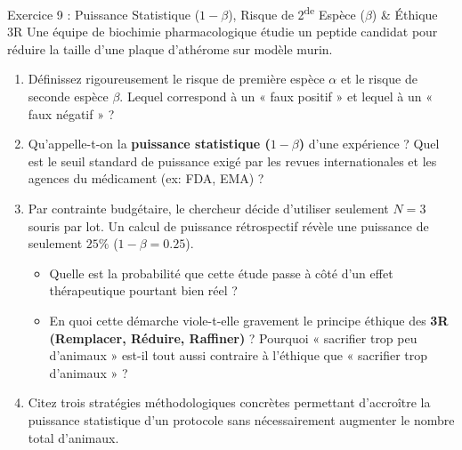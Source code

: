 \documentclass[11pt,a4paper]{article}
\begin{document}
\begin{exercicebox}{Exercice 9 : Puissance Statistique ($1-\beta$), Risque de 2\textsuperscript{de} Espèce ($\beta$) \& Éthique 3R}
Une équipe de biochimie pharmacologique étudie un peptide candidat pour réduire la taille d'une plaque d'athérome sur modèle murin.
\begin{enumerate}[label=\textbf{\alph*.}]
  \item Définissez rigoureusement le risque de première espèce $\alpha$ et le risque de seconde espèce $\beta$. Lequel correspond à un « faux positif » et lequel à un « faux négatif » ?
  \item Qu'appelle-t-on la \textbf{puissance statistique ($1 - \beta$)} d'une expérience ? Quel est le seuil standard de puissance exigé par les revues internationales et les agences du médicament (ex: FDA, EMA) ?
  \item Par contrainte budgétaire, le chercheur décide d'utiliser seulement $N = 3$ souris par lot. Un calcul de puissance rétrospectif révèle une puissance de seulement $25\%$ ($1 - \beta = 0.25$).
  \begin{itemize}
    \item Quelle est la probabilité que cette étude passe à côté d'un effet thérapeutique pourtant bien réel ?
    \item En quoi cette démarche viole-t-elle gravement le principe éthique des \textbf{3R (Remplacer, Réduire, Raffiner)} ? Pourquoi « sacrifier trop peu d'animaux » est-il tout aussi contraire à l'éthique que « sacrifier trop d'animaux » ?
  \end{itemize}
  \item Citez trois stratégies méthodologiques concrètes permettant d'accroître la puissance statistique d'un protocole sans nécessairement augmenter le nombre total d'animaux.
\end{enumerate}
\end{exercicebox}
\end{document}
